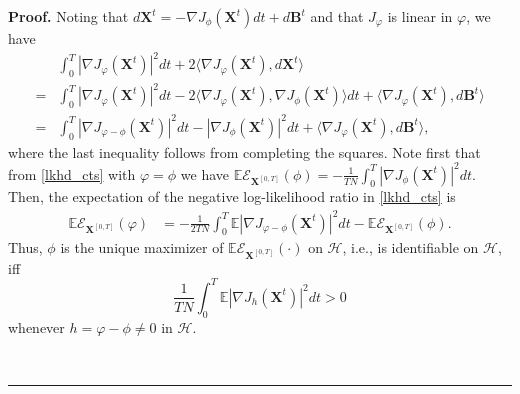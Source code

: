 \documentclass[]{elsarticle}
\def\E{\mathbb{E}}
\newcommand{\mbf}[1]{\boldsymbol{#1}}
\newcommand{\bB}{\mbf{B}}
\newcommand{\bX}{\mbf{X}}
\def\pV{J}
\newcommand{\intkernelvar}{\varphi}
\newcommand{\hypspace}{\mathcal{H}}
\newenvironment{proof}[1][Proof]{\noindent\textbf{#1.} }{\ \rule{0.5em}{0.5em}}
\numberwithin{equation}{section}
\numberwithin{theorem}{section}
\begin{document}
 \begin{proof}
 Noting that $d\bX^t= - \nabla J_{\phi}(\bX^t)dt + d\bB^t$ and that $J_{\intkernelvar}$ is linear in $\intkernelvar$, we have
\begin{align*}
  & \int_0^T |\nabla \pV_{\intkernelvar}(\bX^t)|^2 dt + 2 \langle \nabla \pV_{\intkernelvar}(\bX^t), d\bX^t \rangle  \\
   = &\int_0^T |\nabla \pV_{\intkernelvar}(\bX^t)|^2 dt - 2 \langle \nabla \pV_{\intkernelvar}(\bX^t), \nabla J_{\phi}(\bX^t) \rangle dt +  \langle \nabla \pV_{\intkernelvar}(\bX^t), d\bB^t \rangle \\
  = &\int_0^T |\nabla \pV_{\intkernelvar -\phi}(\bX^t)|^2 dt -  |\nabla \pV_{\phi}(\bX^t)|^2 dt +  \langle \nabla \pV_{\intkernelvar}(\bX^t), d\bB^t \rangle, 
\end{align*}
where the last inequality follows from completing the squares. Note first that from \eqref{lkhd_cts} with $\varphi= \phi$ we have $\E\mathcal{E}_{\bX^{[0,T]}}(\phi) = - \frac{1}{TN} \int_0^T  |\nabla \pV_{\phi}(\bX^t)|^2 dt$.  Then, the expectation of the negative log-likelihood ratio in \eqref{lkhd_cts}  is 
\begin{align} \label{eq:Elkhd_cts}
\E\mathcal{E}_{\bX^{[0,T]}}(\intkernelvar)&=- \frac{1}{2TN}\int_{0}^T \E |\nabla \pV_{\intkernelvar -\phi}(\bX^t)|^2 dt -\E\mathcal{E}_{\bX^{[0,T]}}(\phi).
\end{align}
Thus, $\phi$ is the unique maximizer of $\E\mathcal{E}_{\bX^{[0,T]}}(\cdot)$ on $\hypspace$, i.e., is identifiable on $\hypspace$, iff  
 \begin{equation}\label{eq:error_control}
 \frac{1}{TN}\int_{0}^T \E |\nabla \pV_{h}(\bX^t)|^2 dt >0
 \end{equation}
whenever $h=\intkernelvar -\phi\neq 0 $ in $\hypspace$.
 

\end{proof}
\end{document}
